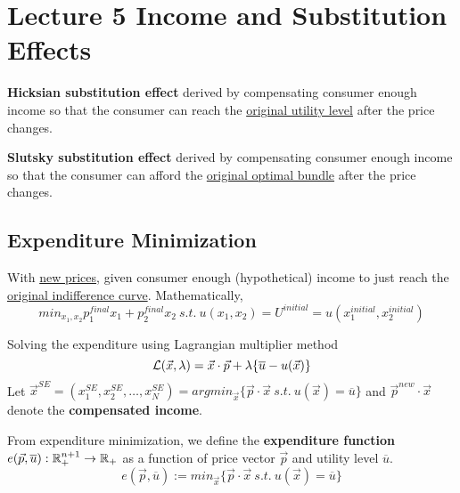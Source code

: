 \documentclass[]{article}
\begin{document}
    \section{Lecture 5 Income and Substitution Effects}
        \begin{definition}
            \textbf{Hicksian substitution effect} derived by compensating consumer enough income so that the consumer can reach the \ul{original utility level} after the price changes.
        \end{definition}
        \begin{definition}
            \textbf{Slutsky substitution effect} derived by compensating consumer enough income so that the consumer can afford the \ul{original optimal bundle} after the price changes.
        \end{definition}
        
        \subsection{Expenditure Minimization}
            \begin{definition}
                With \ul{new prices}, given consumer enough (hypothetical) income to just reach the \ul{original indifference curve}. Mathematically,
                \[
                    min_{x_1,x_2} p_1^{final} x_1 + p_2^{final} x_2 \ s.t.\ u(x_1, x_2) = U^{initial} = u(x_1^{initial}, x_2^{initial})
                \]
            \end{definition}
            
            \par Solving the expenditure using Lagrangian multiplier method 
                \[
                    \mathcal{{L}}(\vec{x}, \lambda) = \vec{x} \cdot \vec{p} + \lambda\{\overline{u} - u(\vec{x}) \}
                \]
                Let $\vec{x}^{SE} = (x_1^{SE}, x_2^{SE}, \dots, x_N^{SE}) = argmin_{\vec{x}}\{\vec{p} \cdot \vec{x}\ s.t.\ u(\vec{x}) = \overline{u}\}$ and $\vec{p}^{new} \cdot \vec{x}$ denote the \textbf{compensated income}.
            
            \begin{definition}
                From expenditure minimization, we define the \textbf{expenditure function} $e(\vec{p}, 
                \overline{u}): \mathbb{R}^{n+1}_+ \rightarrow \mathbb{R}_+$ as a function of price vector $\vec{p}$ and utility level $\overline{u}$.
                \[
                    e(\vec{p}, \overline{u}) := min_{\vec{x}} \{\vec{p} \cdot \vec{x} \ s.t. \ u(\vec{x}) = \overline{u} \}
                \]
            \end{definition}
            
\end{document}
